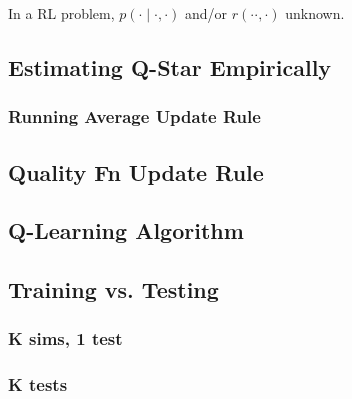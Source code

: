 \begin{summary}
    In a RL problem, $p(\cdot \mid \cdot, \cdot)$ and/or $r(\cdot \cdot, \cdot)$ unknown. 
\end{summary}

\subsection{Estimating Q-Star Empirically}
\begin{summary}
    
\end{summary}

\subsubsection{Running Average Update Rule}
\begin{definition}
    
\end{definition}

\subsection{Quality Fn Update Rule}

\subsection{Q-Learning Algorithm}

\subsection{Training vs. Testing}

\subsubsection{K sims, 1 test}

\subsubsection{K tests}
